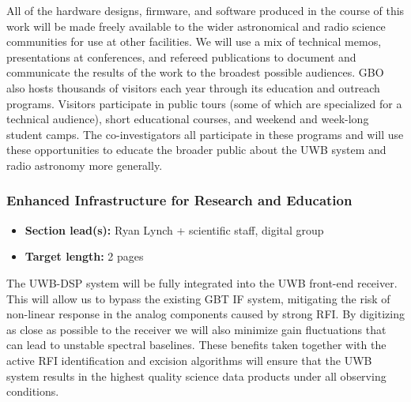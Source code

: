 \documentclass[10pt]{myNSF}
\begin{document}
All of the hardware designs, firmware, and software produced in the
course of this work will be made freely available to the wider
astronomical and radio science communities for use at other
facilities.  We will use a mix of technical memos, presentations at
conferences, and refereed publications to document and communicate the
results of the work to the broadest possible audiences.  GBO also
hosts thousands of visitors each year through its education and
outreach programs.  Visitors participate in public tours (some of
which are specialized for a technical audience), short educational
courses, and weekend and week-long student camps.  The
co-investigators all participate in these programs and will use these
opportunities to educate the broader public about the UWB system and
radio astronomy more generally.

\subsubsection{Enhanced Infrastructure for Research and Education}
\label{sec:infrastructure}

\begin{itemize}
\item{\textbf{Section lead(s):} Ryan Lynch + scientific staff, digital
    group}
\item{\textbf{Target length:} 2 pages}
\end{itemize}


The UWB-DSP system will be fully integrated into the UWB front-end
receiver.  This will allow us to bypass the existing GBT IF system,
mitigating the risk of non-linear response in the analog components
caused by strong RFI.  By digitizing as close as possible to the
receiver we will also minimize gain fluctuations that can lead to
unstable spectral baselines.  These benefits taken together with the
active RFI identification and excision algorithms will ensure that the
UWB system results in the highest quality science data products under
all observing conditions.

\end{document}
